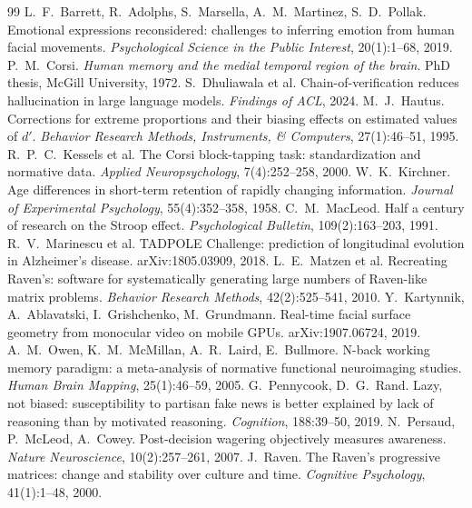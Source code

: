 \documentclass[11pt,a4paper]{article}
\begin{document}
\begin{thebibliography}{99}\small
\setlength{\itemsep}{0.1em}
 L.~F.~Barrett, R.~Adolphs, S.~Marsella, A.~M.~Martinez, S.~D.~Pollak. Emotional expressions reconsidered: challenges to inferring emotion from human facial movements. \emph{Psychological Science in the Public Interest}, 20(1):1--68, 2019.
 P.~M.~Corsi. \emph{Human memory and the medial temporal region of the brain}. PhD thesis, McGill University, 1972.
 S.~Dhuliawala et al. Chain-of-verification reduces hallucination in large language models. \emph{Findings of ACL}, 2024.
 M.~J.~Hautus. Corrections for extreme proportions and their biasing effects on estimated values of $d'$. \emph{Behavior Research Methods, Instruments, \& Computers}, 27(1):46--51, 1995.
 R.~P.~C.~Kessels et al. The Corsi block-tapping task: standardization and normative data. \emph{Applied Neuropsychology}, 7(4):252--258, 2000.
 W.~K.~Kirchner. Age differences in short-term retention of rapidly changing information. \emph{Journal of Experimental Psychology}, 55(4):352--358, 1958.
 C.~M.~MacLeod. Half a century of research on the Stroop effect. \emph{Psychological Bulletin}, 109(2):163--203, 1991.
 R.~V.~Marinescu et al. TADPOLE Challenge: prediction of longitudinal evolution in Alzheimer's disease. arXiv:1805.03909, 2018.
 L.~E.~Matzen et al. Recreating Raven's: software for systematically generating large numbers of Raven-like matrix problems. \emph{Behavior Research Methods}, 42(2):525--541, 2010.
\ifcamera
{} Y.~Kartynnik, A.~Ablavatski, I.~Grishchenko, M.~Grundmann. Real-time facial surface geometry from monocular video on mobile GPUs. arXiv:1907.06724, 2019.
\fi
{} A.~M.~Owen, K.~M.~McMillan, A.~R.~Laird, E.~Bullmore. N-back working memory paradigm: a meta-analysis of normative functional neuroimaging studies. \emph{Human Brain Mapping}, 25(1):46--59, 2005.
 G.~Pennycook, D.~G.~Rand. Lazy, not biased: susceptibility to partisan fake news is better explained by lack of reasoning than by motivated reasoning. \emph{Cognition}, 188:39--50, 2019.
 N.~Persaud, P.~McLeod, A.~Cowey. Post-decision wagering objectively measures awareness. \emph{Nature Neuroscience}, 10(2):257--261, 2007.
 J.~Raven. The Raven's progressive matrices: change and stability over culture and time. \emph{Cognitive Psychology}, 41(1):1--48, 2000.

\end{thebibliography}
\end{document}
